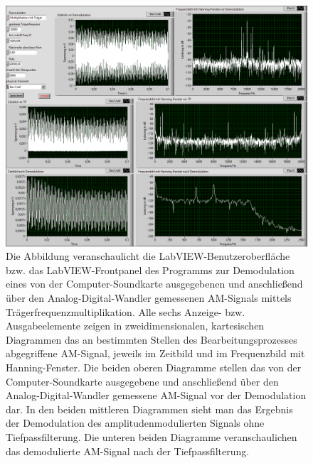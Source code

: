 \documentclass[
a4paper,
12pt,
pagesize,
ngerman
]{scrartcl}
\begin{document}
	\begin{figure}[H]
		\centering
		\includegraphics[width=1.0\textwidth]{EIRE2018Dateien/Tag4/traegerMultOszi/Oszilloskop__modifiziertp}
		\caption{Die Abbildung veranschaulicht die LabVIEW-Benutzeroberfläche bzw. das LabVIEW-Frontpanel des Programms zur Demodulation eines von der Computer-Soundkarte ausgegebenen und anschließend über den Analog-Digital-Wandler gemessenen AM-Signals mittels Trägerfrequenzmultiplikation. Alle sechs Anzeige- bzw. Ausgabeelemente zeigen in zweidimensionalen, kartesischen Diagrammen das an bestimmten Stellen des Bearbeitungsprozesses abgegriffene AM-Signal, jeweils im Zeitbild und im Frequenzbild mit Hanning-Fenster. Die beiden oberen Diagramme stellen das von der Computer-Soundkarte ausgegebene und anschließend über den Analog-Digital-Wandler gemessene AM-Signal vor der Demodulation dar. In den beiden mittleren Diagrammen sieht man das Ergebnis der Demodulation des amplitudenmodulierten Signals ohne Tiefpassfilterung. Die unteren beiden Diagramme veranschaulichen das demodulierte AM-Signal nach der Tiefpassfilterung.}
		\label{MultiTraegerFrontpanel}
	\end{figure}
	
\end{document}
